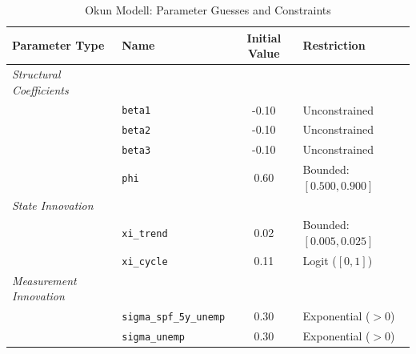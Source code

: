 \begin{table}[htbp]
\centering
\caption{Okun Modell: Parameter Guesses and Constraints}
\label{tab:okun_model_ssm_specs}
\begin{tabular}{llcl}
\hline\hline
\textbf{Parameter Type} & \textbf{Name} & \textbf{Initial Value} & \textbf{Restriction} \\ \hline
\textit{Structural Coefficients} &&& \\
    & \texttt{beta1} & -0.10 & Unconstrained \\
    & \texttt{beta2} & -0.10 & Unconstrained \\
    & \texttt{beta3} & -0.10 & Unconstrained \\
    & \texttt{phi} & 0.60 & Bounded: $[0.500, 0.900]$ \\
\hline
\textit{State Innovation} &&& \\
    & \texttt{xi\_trend} & 0.02 & Bounded: $[0.005, 0.025]$ \\
    & \texttt{xi\_cycle} & 0.11 & Logit ($[0, 1]$) \\
\hline
\textit{Measurement Innovation} &&& \\
    & \texttt{sigma\_spf\_5y\_unemp} & 0.30 & Exponential ($>0$) \\
    & \texttt{sigma\_unemp} & 0.30 & Exponential ($>0$) \\
\hline\hline
\end{tabular}
\end{table}
